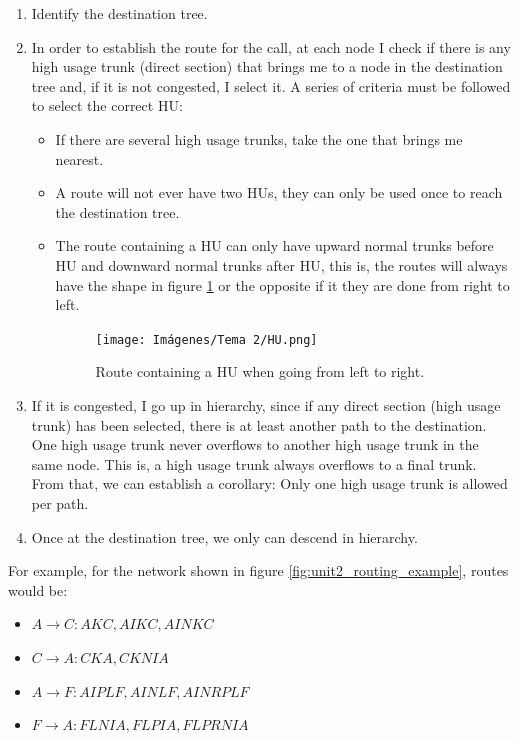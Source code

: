 \documentclass[
	12pt,
	twoside
]{book}
\begin{document}
\begin{enumerate}
	\item Identify the destination tree.
	\item {
		In order to establish the route for the call, at each node I check if there is any high usage trunk (direct section) that brings me to a node in the destination tree and, if it is not congested, I select it. A series of criteria must be followed to select the correct HU:

		\begin{itemize}
			\item If there are several high usage trunks, take the one that brings me nearest.
			\item A route will not ever have two HUs, they can only be used once to reach the destination tree.
			\item {
				The route containing a HU can only have upward normal trunks before HU and downward normal trunks after HU, this is, the routes will always have the shape in figure \ref{fig:unit2_HU_route} or the opposite if it they are done from right to left.

				\begin{figure}[H]
					\centering
					\texttt{[image: Imágenes/Tema 2/HU.png]}
					\caption{
						\label{fig:unit2_HU_route}
						Route containing a HU when going from left to right.
					}
				\end{figure}
			}
		\end{itemize}
	}
	\item If it is congested, I go up in hierarchy, since if any direct section (high usage trunk) has been selected, there is at least another path to the destination. One high usage trunk never overflows to another high usage trunk in the same node. This is, a high usage trunk always overflows to a final trunk. From that, we can establish a corollary: Only one high usage trunk is allowed per path.
	\item Once at the destination tree, we only can descend in hierarchy.
\end{enumerate}

For example, for the network shown in figure \ref{fig:unit2_routing_example}, routes would be:

\begin{itemize}
	\item $A \rightarrow C: AKC, AIKC, AINKC$
	\item $C \rightarrow A: CKA, CKNIA$
	\item $A \rightarrow F: AIPLF, AINLF, AINRPLF$
	\item $F \rightarrow A: FLNIA, FLPIA, FLPRNIA$
\end{itemize}
\end{document}
